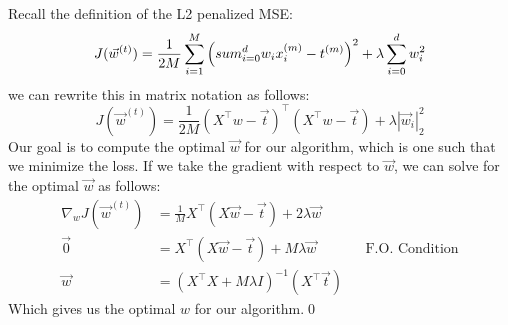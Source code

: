Recall the definition of the L2 penalized MSE:
\[
  J(\vec{w}^{(t)}) = \frac{1}{2M} \sum_{i=1}^{M} \left(\\sum_{i=0}^d w_{i}x_{i}^{(m)} - t^{(m)}\right)^2 + \lambda \sum_{i=0}^{d}w_{i}^{2}
\]
we can rewrite this in matrix notation as follows:
\[
  J(\vec{w}^{(t)}) = \frac{1}{2M} (X^\top w - \vec{t})^{\top}(X^{\top}w-\vec{t}) + \lambda |\vec{w}_{i}|^{2}_{2}
\]
Our goal is to compute the optimal $\vec{w}$ for our algorithm, which is one such that we minimize the loss. If we take the gradient with respect to $\vec{w}$, we can solve for the optimal $\vec{w}$ as follows:
\begin{align*}
  \nabla_{w} J(\vec{w}^{(t)}) &= \frac{1}{M}X^{\top}(X\vec{w} - \vec{t}) + 2\lambda\vec{w}\\
  \vec{0}&= X^{\top}(X\vec{w} - \vec{t}) + M\lambda\vec{w} && \text{F.O. Condition}\\
  \vec{w}&=\left(X^{\top}X + M\lambda I\right)^{-1}(X^{\top}\vec{t})
\end{align*}
Which gives us the optimal $w$ for our algorithm.\qed
